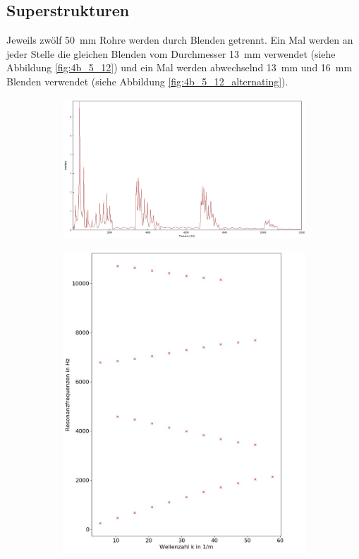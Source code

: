 \subsection{Superstrukturen}
\label{subsec:Superstrukturen}
Jeweils zwölf 50~mm Rohre werden durch Blenden getrennt. 
Ein Mal werden an jeder Stelle die gleichen Blenden vom Durchmesser 13~mm verwendet (siehe Abbildung \ref{fig:4b_5_12}) und ein Mal werden abwechselnd 13~mm und 16~mm Blenden verwendet (siehe Abbildung \ref{fig:4b_5_12_alternating}).
\begin{figure}
\centering
\begin{subfigure}{0.65\textwidth}
\includegraphics[width=\textwidth]{content/messungen/Chapter4b/4b_5_12_13.jpg}
\end{subfigure}
\begin{subfigure}{0.34\textwidth}
\includegraphics[width=\textwidth]{content/Scripts/4b_5_red.jpg}

\end{subfigure}
\end{figure}
